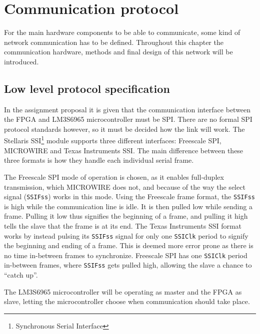 \chapter{Communication protocol}\label{chap:comm}
For the main hardware components to be able to communicate, some kind of network communication has to be defined. Throughout this chapter the communication hardware, methods and final design of this network will be introduced.


\section{Low level protocol specification}\label{sec:spi_lowlvl_protocol}
In the assignment proposal it is given that the communication interface between the FPGA and LM3S6965 microcontroller must be SPI. There are no formal SPI protocol standards however, so it must be decided how the link will work. The Stellaris SSI\footnote{Synchronous Serial Interface} module supports three different interfaces: Freescale SPI, MICROWIRE and Texas Instruments SSI. The main difference between these three formats is how they handle each individual serial frame.

The Freescale SPI mode of operation is chosen, as it enables full-duplex transmission, which MICROWIRE does not, and because of the way the select signal (\texttt{SSIFss}) works in this mode. Using the Freescale frame format, the \texttt{SSIFss} is high while the communication line is idle. It is then pulled low while sending a frame. Pulling it low thus signifies the beginning of a frame, and pulling it high tells the slave that the frame is at its end. The Texas Instruments SSI format works by instead pulsing its \texttt{SSIFss} signal for only one \texttt{SSIClk} period to signify the beginning and ending of a frame. This is deemed more error prone as there is no time in-between frames to synchronize. Freescale SPI has one \texttt{SSIClk} period in-between frames, where \texttt{SSIFss} gets pulled high, allowing the slave a chance to ``catch up''.


The LM3S6965 microcontroller will be operating as master and the FPGA as slave, letting the microcontroller choose when communication should take place.

